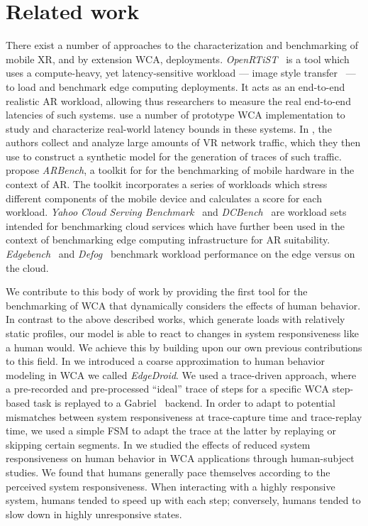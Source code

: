 \section{Related work}\label{sec:relwork}

There exist a number of approaches to the characterization and benchmarking of mobile \ac{XR}, and by extension \ac{WCA}, deployments.
\emph{OpenRTiST}~\cite{george2020openrtist} is a tool which uses a compute-heavy, yet latency-sensitive workload --- image style transfer~\cite{jing2019neural} --- to load and benchmark edge computing deployments.
It acts as an end-to-end realistic \ac{AR} workload, allowing thus researchers to measure the real end-to-end latencies of such systems.
\textcite{Chen2017Empirical} use a number of prototype \ac{WCA} implementation to study and characterize real-world latency bounds in these systems.
In \textcite{lecci2021open}, the authors collect and analyze large amounts of \ac{VR} network traffic, which they then use to construct a synthetic model for the generation of traces of such traffic.
\textcite{chetoui2022arbench} propose \emph{ARBench}, a toolkit for for the benchmarking of mobile hardware in the context of \ac{AR}.
The toolkit incorporates a series of workloads which stress different components of the mobile device and calculates a score for each workload.
\emph{Yahoo Cloud Serving Benchmark}~\cite{cooper2010benchmarking} and \emph{DCBench}~\cite{jia2013characterizing} are workload sets intended for benchmarking cloud services which have further been used in the context of benchmarking edge computing infrastructure for \ac{AR} suitability.
\emph{Edgebench}~\cite{das2018edgebench} and \emph{Defog}~\cite{mcchesney2019defog} benchmark workload performance on the edge versus on the cloud.

We contribute to this body of work by providing the first tool for the benchmarking of \ac{WCA} that dynamically considers the effects of human behavior.
In contrast to the above described works, which generate loads with relatively static profiles, our model is able to react to changes in system responsiveness like a human would.
We achieve this by building upon our own previous contributions to this field.
In \textcite{olguin2018scaling,olguin2019edgedroid} we introduced a coarse approximation to human behavior modeling in \ac{WCA} we called \emph{EdgeDroid}.
We used a trace-driven approach, where a pre-recorded and pre-processed ``ideal'' trace of steps for a specific \ac{WCA} step-based task is replayed to a Gabriel~\cite{Chen2018application} backend.
In order to adapt to potential mismatches between system responsiveness at trace-capture time and trace-replay time, we used a simple \ac{FSM} to adapt the trace at the latter by replaying or skipping certain segments.
In \textcite{olguinmunoz:impact2021} we studied the effects of reduced system responsiveness on human behavior in \ac{WCA} applications through human-subject studies.
We found that humans generally pace themselves according to the perceived system responsiveness.
When interacting with a highly responsive system, humans tended to speed up with each step; conversely, humans tended to slow down in highly unresponsive states.

